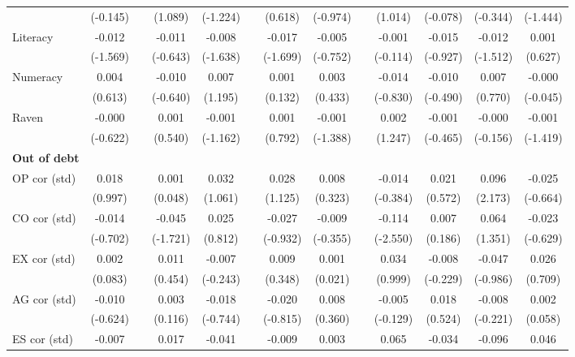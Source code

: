 \begin{table}[htbp]
{\begin{tabular}{lcccccccccccc}
      & (-0.145) &   & (1.089) & (-1.224) &   & (0.618) & (-0.974) &   & (1.014) & (-0.078) & (-0.344) & (-1.444) \\
    Literacy & -0.012 &   & -0.011 & -0.008 &   & \cellcolor[rgb]{ 1,  1,  0}-0.017 & -0.005 &   & -0.001 & -0.015 & -0.012 & 0.001 \\
      & (-1.569) &   & (-0.643) & (-1.638) &   & (-1.699) & (-0.752) &   & (-0.114) & (-0.927) & (-1.512) & (0.627) \\
    Numeracy & 0.004 &   & -0.010 & 0.007 &   & 0.001 & 0.003 &   & -0.014 & -0.010 & 0.007 & -0.000 \\
      & (0.613) &   & (-0.640) & (1.195) &   & (0.132) & (0.433) &   & (-0.830) & (-0.490) & (0.770) & (-0.045) \\
    Raven & -0.000 &   & 0.001 & -0.001 &   & 0.001 & -0.001 &   & 0.002 & -0.001 & -0.000 & -0.001 \\
      & (-0.622) &   & (0.540) & (-1.162) &   & (0.792) & (-1.388) &   & (1.247) & (-0.465) & (-0.156) & (-1.419) \\
    \midrule
    \textbf{Out of debt} &   &   &   &   &   &   &   &   &   &   &   &  \\
    OP cor (std) & 0.018 &   & 0.001 & 0.032 &   & 0.028 & 0.008 &   & -0.014 & 0.021 & \cellcolor[rgb]{ 1,  1,  0}0.096 & -0.025 \\
      & (0.997) &   & (0.048) & (1.061) &   & (1.125) & (0.323) &   & (-0.384) & (0.572) & (2.173) & (-0.664) \\
    CO cor (std) & -0.014 &   & \cellcolor[rgb]{ 1,  1,  0}-0.045 & 0.025 &   & -0.027 & -0.009 &   & \cellcolor[rgb]{ 1,  1,  0}-0.114 & 0.007 & 0.064 & -0.023 \\
      & (-0.702) &   & (-1.721) & (0.812) &   & (-0.932) & (-0.355) &   & (-2.550) & (0.186) & (1.351) & (-0.629) \\
    EX cor (std) & 0.002 &   & 0.011 & -0.007 &   & 0.009 & 0.001 &   & 0.034 & -0.008 & -0.047 & 0.026 \\
      & (0.083) &   & (0.454) & (-0.243) &   & (0.348) & (0.021) &   & (0.999) & (-0.229) & (-0.986) & (0.709) \\
    AG cor (std) & -0.010 &   & 0.003 & -0.018 &   & -0.020 & 0.008 &   & -0.005 & 0.018 & -0.008 & 0.002 \\
      & (-0.624) &   & (0.116) & (-0.744) &   & (-0.815) & (0.360) &   & (-0.129) & (0.524) & (-0.221) & (0.058) \\
    ES cor (std) & -0.007 &   & 0.017 & -0.041 &   & -0.009 & 0.003 &   & 0.065 & -0.034 & \cellcolor[rgb]{ 1,  1,  0}-0.096 & 0.046 \\

\end{tabular}}
\end{table}
